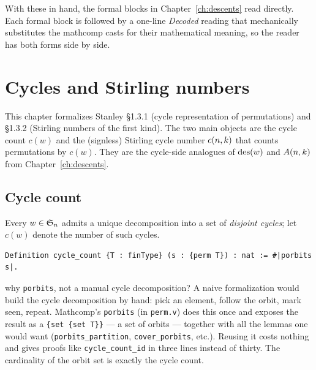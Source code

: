 \noindent With these in hand, the formal blocks in
Chapter~\ref{ch:descents} read directly. Each formal block is
followed by a one-line \emph{Decoded} reading that mechanically
substitutes the mathcomp casts for their mathematical meaning, so
the reader has both forms side by side.

\clearpage

\chapter{Cycles and Stirling numbers}
\label{ch:cycles}

This chapter formalizes Stanley \S1.3.1 (cycle representation of
permutations) and \S1.3.2 (Stirling numbers of the first kind). The
two main objects are the cycle count $c(w)$ and the (signless)
Stirling cycle number $c(n, k)$ that counts permutations by
$c(w)$. They are the cycle-side analogues of $\mathrm{des}(w)$ and
$A(n, k)$ from Chapter~\ref{ch:descents}.

\section{Cycle count}

\begin{definition}
  \label{def:cycle_count}
  Every $w \in \mathfrak{S}_{n}$ admits a unique decomposition into a set of
  \emph{disjoint cycles}; let $c(w)$ denote the number of such
  cycles.
\end{definition}

\begin{lstlisting}[language=Rocq]
Definition cycle_count {T : finType} (s : {perm T}) : nat := #|porbits s|.
\end{lstlisting}


\begin{sidebar}{why \texttt{porbits}, not a manual cycle decomposition?}
A naive formalization would build the cycle decomposition by hand:
pick an element, follow the orbit, mark seen, repeat. Mathcomp's
\texttt{porbits} (in \texttt{perm.v}) does this once and exposes the
result as a \texttt{\{set \{set T\}\}} --- a set of orbits ---
together with all the lemmas one would want
(\texttt{porbits\_partition}, \texttt{cover\_porbits}, etc.). Reusing
it costs nothing and gives proofs like \texttt{cycle\_count\_id}
in three lines instead of thirty. The cardinality of the orbit set
is exactly the cycle count.
\end{sidebar}

